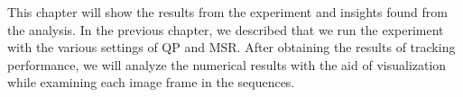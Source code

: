 This chapter will show the results from the experiment and insights found from the analysis. In the previous chapter, we described that we run the experiment with the various settings of QP and MSR. After obtaining the results of tracking performance, we will analyze the numerical results with the aid of visualization while examining each image frame in the sequences.